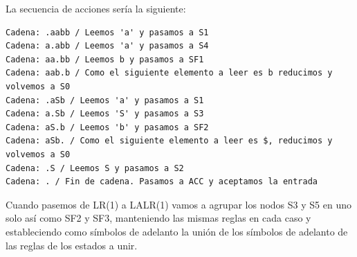 \documentclass[nochap]{apuntes}
\begin{document}
\begin{problem}
\ppart
La secuencia de acciones sería la siguiente:
\begin{verbatim}
Cadena: .aabb / Leemos 'a' y pasamos a S1
Cadena: a.abb / Leemos 'a' y pasamos a S4
Cadena: aa.bb / Leemos b y pasamos a SF1
Cadena: aab.b / Como el siguiente elemento a leer es b reducimos y volvemos a S0
Cadena: .aSb / Leemos 'a' y pasamos a S1
Cadena: a.Sb / Leemos 'S' y pasamos a S3
Cadena: aS.b / Leemos 'b' y pasamos a SF2
Cadena: aSb. / Como el siguiente elemento a leer es $, reducimos y volvemos a S0
Cadena: .S / Leemos S y pasamos a S2
Cadena: . / Fin de cadena. Pasamos a ACC y aceptamos la entrada
\end{verbatim}

\ppart
Cuando pasemos de LR(1) a LALR(1) vamos a agrupar los nodos S3 y S5 en uno solo así como SF2 y SF3, manteniendo las mismas reglas en cada caso y estableciendo como símbolos de adelanto la unión de los símbolos de adelanto de las reglas de los estados a unir.
\end{problem}
\end{document}

